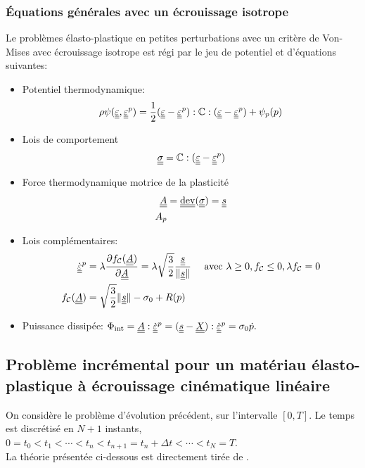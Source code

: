 \documentclass[10pt]{book}
\newcommand{\FthEpsp}{\ten{A}}
\begin{document}
\begin{appendices}
\subsubsection{Équations générales avec un écrouissage isotrope}
Le problèmes élasto-plastique en petites perturbations avec un critère de Von-Mises avec écrouissage isotrope est régi par le jeu de potentiel et d'équations suivantes:
\begin{itemize}
\item Potentiel thermodynamique:
$$\rho \psi(\underline{\underline{\varepsilon}},\underline{\underline{\varepsilon}}^p)=\frac{1}{2}(\underline{\underline{\varepsilon}}-\underline{\underline{\varepsilon}}^p):\mathbb{C}:(\underline{\underline{\varepsilon}}-\underline{\underline{\varepsilon}}^p)+\psi_{p}(p)$$
\item Lois de comportement
$$\underline{\underline{\sigma}} =\mathbb{C}:(\underline{\underline{\varepsilon}}-\underline{\underline{\varepsilon}}^p)$$
\item Force thermodynamique motrice de la plasticité
$$\begin{aligned}
\FthEpsp&=\dev(\SC)=\devia\\
A_{p}
\end{aligned}$$
\item Lois complémentaires:
$$\begin{aligned}
\dot{\DefoHPP}^{p}&=\lambda\frac{\partial \FChargeConvexe(\FthEpsp)}{\partial \FthEpsp}=\lambda\sqrt{\frac{3}{2}}\frac{\devia}{\Vert \devia\Vert} \quad \avec \lambda\geq 0, \FChargeConvexe\leq 0, \lambda\FChargeConvexe=0\\
\FChargeConvexe(\FthEpsp)&=\sqrt{\frac{3}{2}}\Vert \devia\Vert-\sigma_{0}+R(p)
\end{aligned}$$
\item Puissance dissipée: $\dint=\FthEpsp:\dot{\DefoHPP}^{p}=(\devia-\TenTranslatDom):\dot{\DefoHPP}^{p}= \sigma_{0}\dot{p}.$
\end{itemize}
\subsection{Problème incrémental pour un matériau élasto-plastique à écrouissage cinématique linéaire}
On considère le problème d'évolution précédent, sur l'intervalle $[0,T]$. Le temps est discrétisé en $N+1$ instants, $0=t_{0}<t_{1} <\cdots<t_{n}<t_{n+1}=t_{n}+\Delta t<\cdots<t_{N}=T.$\\

La théorie présentée ci-dessous est directement tirée de \cite{maitournam2017materiaux}.\\


\end{appendices}
\end{document}
